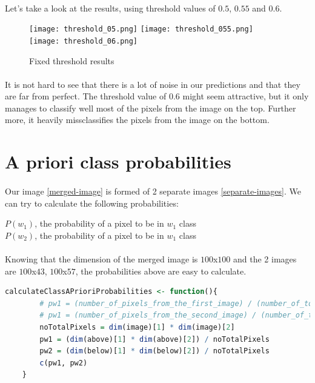 \clearpage

\paragraph{}
Let's take a look at the results, using threshold values of $0.5$, $0.55$ and $0.6$.

\begin{figure}[h]
    \centering
    \texttt{[image: threshold\_05.png]}
    \texttt{[image: threshold\_055.png]}
    \texttt{[image: threshold\_06.png]}
    \caption{Fixed threshold results}
    \label{}
\end{figure}

\paragraph{}
It is not hard to see that there is a lot of noise in our predictions and that they are far from perfect.
The threshold value of $0.6$ might seem attractive, but it only manages to classify well most of the pixels from the image on the top.
Further more, it heavily missclassifies the pixels from the image on the bottom.

\section{A priori class probabilities}
\paragraph{}
Our image \ref{merged-image} is formed of 2 separate images \ref{separate-images}.
We can try to calculate the following probabilities:
\begin{center}
    $P(w_1)$, the probability of a pixel to be in $w_1$ class
    \\
    $P(w_2)$, the probability of a pixel to be in $w_1$ class
\end{center}

\paragraph{}
Knowing that the dimension of the merged image is $100$x$100$ and the 2 images are $100$x$43$, $100$x$57$, the probabilities above are easy to calculate.

\begin{lstlisting}[language=R, caption=A priori class probabilities]
    calculateClassAPrioriProbabilities <- function(){
        # pw1 = (number_of_pixels_from_the_first_image) / (number_of_total_pixels)
        # pw1 = (number_of_pixels_from_the_second_image) / (number_of_total_pixels)
        noTotalPixels = dim(image)[1] * dim(image)[2]
        pw1 = (dim(above)[1] * dim(above)[2]) / noTotalPixels
        pw2 = (dim(below)[1] * dim(below)[2]) / noTotalPixels
        c(pw1, pw2)
    }
\end{lstlisting}

